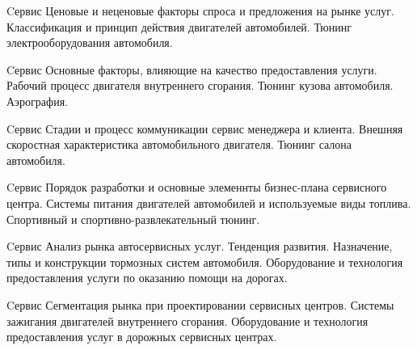 \documentclass[
	11pt,
	a4paper,
	]
	{article}
\begin{document}
\begin{minipage}[t][\miniH]{\miniL}\centering
	 {Cервис}
		{
			Ценовые и неценовые факторы спроса и предложения на рынке услуг.
		}{
			Классификация и принцип действия двигателей автомобилей.
		}{
			Тюнинг электрооборудования автомобиля.
		}
	\lowGE
\end{minipage}





\begin{minipage}[t][\miniH]{\miniL}\centering
	 {Cервис}
		{
			Основные факторы, влияющие на качество предоставления услуги.
		}{
			Рабочий процесс двигателя внутреннего сгорания.
		}{
			Тюнинг кузова автомобиля. Аэрография.
		}
	\lowGE
\end{minipage}

\vfill



\begin{minipage}[t][\miniH]{\miniL}\centering
	 {Cервис}
		{
			Стадии и процесс коммуникации сервис менеджера и клиента.
		}{
			Внешняя скоростная характеристика автомобильного двигателя.
		}{
			Тюнинг салона автомобиля.
		}
	\lowGE
\end{minipage}

\vfill



\begin{minipage}[t][\miniH]{\miniL}\centering
	 {Cервис}
		{
			Порядок разработки и основные элеменнты бизнес-плана сервисного центра.
		}{
			Системы питания двигателей автомобилей и используемые виды топлива.
		}{
			Спортивный и спортивно-развлекательный тюнинг.
		}
	\lowGE
\end{minipage}





\begin{minipage}[t][\miniH]{\miniL}\centering
	 {Cервис}
		{
			Анализ рынка автосервисных услуг. Тенденция развития.
		}{
			Назначение, типы и конструкции тормозных систем автомобиля.
		}{
			Оборудование и технология предоставления услуги по оказанию помощи на дорогах.
		}
	\lowGE
\end{minipage}

\vfill



\begin{minipage}[t][\miniH]{\miniL}\centering
	 {Cервис}
		{
			Сегментация рынка при проектировании сервисных центров.
		}{
			Системы зажигания двигателей внутреннего сгорания.
		}{
			Оборудование и технология предоставления услуг в дорожных сервисных центрах.
		}
	\lowGE
\end{minipage}
\end{document}
